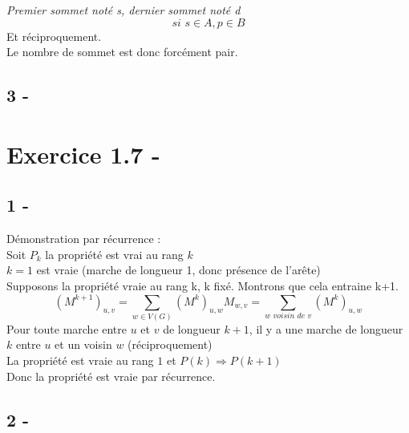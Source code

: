 \documentclass{article}
\begin{document}
            \textit{Premier sommet noté s, dernier sommet noté d}
            $$
            \textit{si } s \in A, p \in B 
            $$
            Et réciproquement.\\
            Le nombre de sommet est donc forcément pair.
        \subsection*{3 -}
    \section*{Exercice 1.7 -}
        \subsection*{1 -}
            Démonstration par récurrence :\\
            Soit $P_{k}$ la propriété est vrai au rang $k$\\
            $k=1$ est vraie (marche de longueur 1, donc présence de l'arête)\\
            Supposons la propriété vraie au rang k, k fixé. Montrons que cela entraine k+1.\\
            $$
                \left(M^{k+1}\right)_{u,v} = \sum_{w \in V(G)} \left(M^{k}\right)_{u,w} M_{w,v}
                = \sum_{w \textit{ voisin de }v} \left(M^{k}\right)_{u,w}
            $$
            Pour toute marche entre $u$ et $v$ de longueur $k+1$, il y a une marche de longueur $k$ entre $u$ et un voisin $w$ (réciproquement)\\
            La propriété est vraie au rang $1$ et $P(k) \Rightarrow P(k+1)$\\
            Donc la propriété est vraie par récurrence.
        \subsection{2 -}
\end{document}
